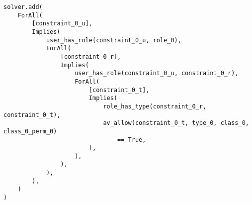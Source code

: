 \documentclass[acmsmall,screen,nonacm]{acmart}
\begin{document}
\begin{appendices}
\begin{small}
\begin{verbatim}
solver.add(
    ForAll(
        [constraint_0_u],
        Implies(
            user_has_role(constraint_0_u, role_0),
            ForAll(
                [constraint_0_r],
                Implies(
                    user_has_role(constraint_0_u, constraint_0_r),
                    ForAll(
                        [constraint_0_t],
                        Implies(
                            role_has_type(constraint_0_r, constraint_0_t),
                            av_allow(constraint_0_t, type_0, class_0, class_0_perm_0)
                                == True,
                        ),
                    ),
                ),
            ),
        ),
    )
)
\end{verbatim}
\end{small}

\end{appendices}
\end{document}
